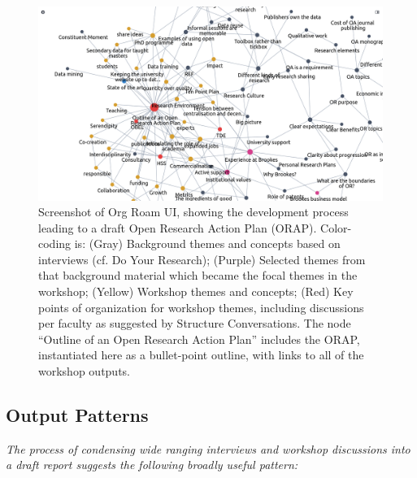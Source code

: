 \documentclass[acmlarge,timestamp]{acmart}
\begin{document}

\begin{figure}[h]
  \includegraphics[width=\textwidth,trim={0 0 0 2cm},clip=true]{org-roam-screenshot.png}
  \caption{Screenshot of Org Roam UI, showing the development process
    leading to a draft Open Research Action Plan (ORAP).  Color-coding
    is: (Gray) Background themes and concepts based on interviews
    (cf. {\sc Do Your Research}); (Purple) Selected themes from that
    background material which became the focal themes in the workshop;
    (Yellow) Workshop themes and concepts; (Red) Key points of
    organization for workshop themes, including discussions per
    faculty as suggested by {\sc Structure Conversations}. The node
    “Outline of an Open Research Action Plan” includes the ORAP,
    instantiated here as a bullet-point outline, with links to all of
    the workshop outputs.
    \label{Org-Roam-Screenshot}}
\end{figure}

\subsection{Output Patterns}

\emph{The process of condensing wide ranging interviews and workshop
discussions into a draft report suggests the following broadly useful
pattern:}


\end{document}
